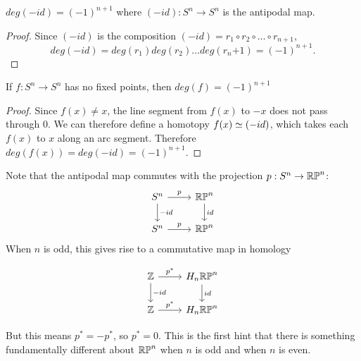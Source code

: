 \begin{corollary}\label{antipodal-degree}
$deg(-id)=(-1)^{n+1}$ where $(-id):S^n\rightarrow S^n$ is the antipodal map.
\end{corollary}
\begin{proof}
Since $(-id)$ is the composition $(-id)=r_1\circ r_2 \circ \dots \circ r_{n+1}$, $$deg(-id)=deg(r_1)deg(r_2)\dots deg(r_n{+1})=(-1)^{n+1}.$$
\cite{Hatcher}
\end{proof}

\begin{corollary}\label{fixed-points}
If $f:S^n\rightarrow S^n$ has no fixed points, then $deg(f)=(-1)^{n+1}$
\end{corollary}
\begin{proof}
Since $f(x)\neq x$, the line segment from $f(x)$ to $-x$ does not pass through $0$. We can therefore define a homotopy $f(x)\simeq (-id)$, which takes each $f(x)$ to $x$ along an arc segment. Therefore $deg(f(x))=deg(-id)=(-1)^{n+1}$.\cite{Hatcher}
\end{proof}

\begin{remark}
Note that the antipodal map commutes with the projection $p:S^n\rightarrow \mathbb{RP}^{n}$:
\[\begin{tikzcd}
S^n \arrow[r, "p"] \arrow[d, "-id"] & \RP{n} \arrow[d, "id"] \\
S^n \arrow[r, "p"]                    & \RP{n}                
\end{tikzcd}\]
When $n$ is odd, this gives rise to a commutative map in homology

\[\begin{tikzcd}
\mathbb{Z} \arrow[r, "p^*"] \arrow[d, "-id"] & H_n\RP{n} \arrow[d, "id"] \\
\mathbb{Z} \arrow[r, "p^*"]                 & H_n\RP{n}                
\end{tikzcd}\]

But this means $p^*=-p^*$, so $p^*=0$. This is the first hint that there is something fundamentally different about $\mathbb{RP}^{n}$ when $n$ is odd and when $n$ is even. 
\end{remark}


